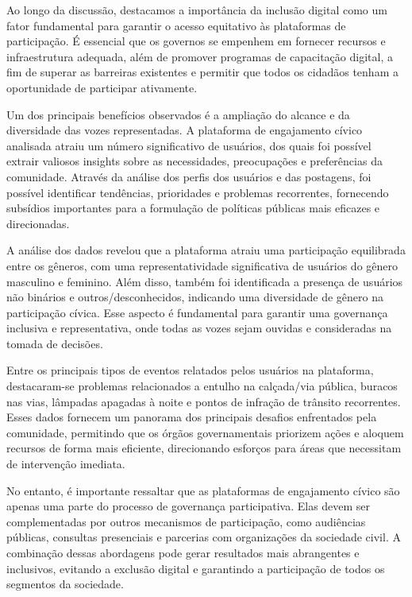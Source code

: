 Ao longo da discussão, destacamos a importância da inclusão digital como um fator fundamental para garantir o acesso equitativo às plataformas de participação. É essencial que os governos se empenhem em fornecer recursos e infraestrutura adequada, além de promover programas de capacitação digital, a fim de superar as barreiras existentes e permitir que todos os cidadãos tenham a oportunidade de participar ativamente.

Um dos principais benefícios observados é a ampliação do alcance e da diversidade das vozes representadas. A plataforma de engajamento cívico analisada atraiu um número significativo de usuários, dos quais foi possível extrair valiosos insights sobre as necessidades, preocupações e preferências da comunidade. Através da análise dos perfis dos usuários e das postagens, foi possível identificar tendências, prioridades e problemas recorrentes, fornecendo subsídios importantes para a formulação de políticas públicas mais eficazes e direcionadas.

A análise dos dados revelou que a plataforma atraiu uma participação equilibrada entre os gêneros, com uma representatividade significativa de usuários do gênero masculino e feminino. Além disso, também foi identificada a presença de usuários não binários e outros/desconhecidos, indicando uma diversidade de gênero na participação cívica. Esse aspecto é fundamental para garantir uma governança inclusiva e representativa, onde todas as vozes sejam ouvidas e consideradas na tomada de decisões.

Entre os principais tipos de eventos relatados pelos usuários na plataforma, destacaram-se problemas relacionados a entulho na calçada/via pública, buracos nas vias, lâmpadas apagadas à noite e pontos de infração de trânsito recorrentes. Esses dados fornecem um panorama dos principais desafios enfrentados pela comunidade, permitindo que os órgãos governamentais priorizem ações e aloquem recursos de forma mais eficiente, direcionando esforços para áreas que necessitam de intervenção imediata.

No entanto, é importante ressaltar que as plataformas de engajamento cívico são apenas uma parte do processo de governança participativa. Elas devem ser complementadas por outros mecanismos de participação, como audiências públicas, consultas presenciais e parcerias com organizações da sociedade civil. A combinação dessas abordagens pode gerar resultados mais abrangentes e inclusivos, evitando a exclusão digital e garantindo a participação de todos os segmentos da sociedade.

